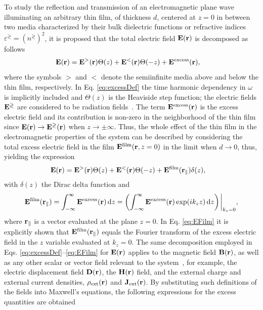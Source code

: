 To study the reflection and transmission of an electromagnetic plane wave illuminating an arbitrary thin film, of thickness $d$, centered at $z=0$ in between two media characterized by their bulk dielectric functions or refractive indices $\varepsilon^\gtrless = (n^\gtrless)^2$, it is proposed that the total electric field $\vb{E}(\vb{r})$ is decomposed as follows~\cite{bedeaux_optical_2004,lazzari_granfilm_2002}
%
\begin{align}
	\vb{E}(\vb{r}) &= \vb{E}^{>}(\vb{r}) \Theta(z) + \vb{E}^{<}(\vb{r}) \Theta(-z) + \vb{E}^\text{excess}(\vb{r}),
	\label{eq:excessDef}
\end{align}
%
where the symbols $>$ and $<$ denote the semiinfinite media above and below the thin film, respectively. In Eq. \eqref{eq:excessDef} the time harmonic dependency in $\omega$ is implicitly included and $\Theta(z)$ is the Heaviside step function; the electric fields $\vb{E}^\gtrless$ are considered to be radiation fields~\cite{bedeaux_optical_2004}. The term $\vb{E}^\text{excess}(\vb{r})$ is the excess electric field and its contribution is non-zero in the neighborhood of the thin film since $\vb{E}(\vb{r}) \to  \vb{E}^{\gtrless}(\vb{r})$ when $z \to \pm \infty$. Thus, the whole effect of the thin film in the electromagnetic properties of the system can be described by considering the total excess electric field in the film $\vb{E}^\text{film}(\vb{r}, z = 0)$ in the limit when $d \to 0$, thus, yielding the expression~\cite{bedeaux_optical_2004,lazzari_granfilm_2002}
%
\begin{align}
	\vb{E}(\vb{r}) &= \vb{E}^{>}(\vb{r}) \Theta(z) + \vb{E}^{<}(\vb{r}) \Theta(-z) + \vb{E}^\text{film}(\vb{r}_\parallel) \delta(z),
		\label{eq:ETotFilm}
\end{align}
%
with $\delta(z)$ the Dirac delta function and
%
\begin{align}
	\vb{E}^\text{film}(\vb{r}_\parallel)
			= \int_{-\infty}^{\infty} \vb{E}^\text{excess}(\vb{r}) \dd{z}
			= \qty(\int_{-\infty}^{\infty} \vb{E}^\text{excess}(\vb{r})\exp(i k_z z) \dd{z})\eval_{k_z = 0},
	\label{eq:EFilm}
\end{align}
%
where $\vb{r}_\parallel$ is a vector evaluated at the plane $z=0$. In Eq. \eqref{eq:EFilm} it is explicitly shown that $	\vb{E}^\text{film}(\vb{r}_\parallel)$ equals the Fourier transform of the excess electric field in the $z$ variable evaluated at $k_z = 0$. The same decomposition employed in Eqs. \eqref{eq:excessDef}--\eqref{eq:EFilm} for $\vb{E}(\vb{r})$ applies to the magnetic field $\vb{B}(\vb{r})$, as well as any other scalar or vector field relevant to the system~\cite{lazzari_granfilm_2002}, for example, the electric displacement field $\vb{D}(\vb{r})$, the $\vb{H}(\vb{r})$ field, and the external charge and external current densities, $\rho_\text{ext}(\vb{r})$  and $\vb{J}_\text{ext}(\vb{r})$. By substituting such definitions of the fields into Maxwell's equations, the following expressions for the excess quantities are obtained \cite{bedeaux_optical_2004}
